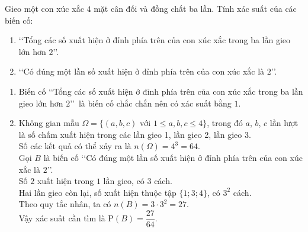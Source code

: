 \begin{ex}%
	Gieo một con xúc xắc $4$ mặt cân đối và đồng chất ba lần. Tính xác suất của các biến cố:
	\begin{enumerate}
		\item \lq\lq Tổng các số xuất hiện ở đỉnh phía trên của con xúc xắc trong ba lần gieo lớn hơn $2$\rq\rq.
		\item \lq\lq Có đúng một lần số xuất hiện ở đỉnh phía trên của con xúc xắc là $2$\rq\rq.
	\end{enumerate}
	\loigiai
	{
		\begin{enumerate}
			\item Biến cố \lq\lq Tổng các số xuất hiện ở đỉnh phía trên của con xúc xắc trong ba lần gieo lớn hơn $2$\rq\rq\ là biến cố chắc chắn nên có xác suất bằng $1$.
			\item Không gian mẫu $\Omega= \{(a,b,c) \text{ với } 1\le a,b,c \le 4\}$, trong đó $a$, $b$, $c$ lần lượt là số chấm xuất hiện trong các lần gieo 1, lần gieo 2, lần gieo 3.\\
			Số các kết quả có thể xảy ra là $n(\Omega)= 4^3=64$.\\
			Gọi $B$ là biến cố \lq\lq Có đúng một lần số xuất hiện ở đỉnh phía trên của con xúc xắc là $2$\rq\rq.\\
			Số $2$ xuất hiện trong $1$ lần gieo, có $3$ cách.\\
			Hai lần gieo còn lại, số xuất hiện thuộc tập $\{1; 3; 4\}$, có $3^2$ cách.\\
			Theo quy tắc nhân, ta có $n(B)= 3\cdot 3^2=27$.\\
			Vậy xác suất cần tìm là $\mathrm{P}(B)= \dfrac{27}{64}$.
		\end{enumerate}
	}
\end{ex}


